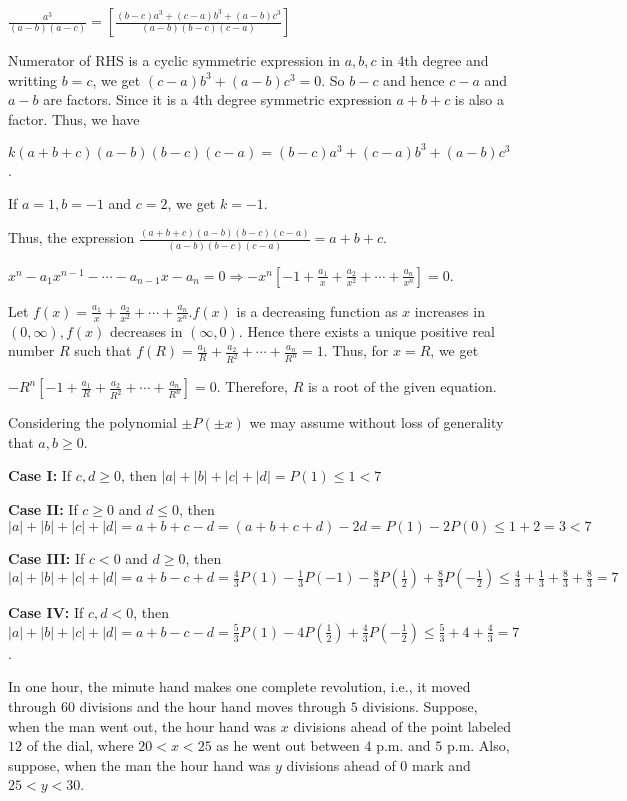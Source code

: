  $\displaystyle\frac{a^3}{(a - b)(a - c)} = \left[\frac{(b - c)a^3 + (c - a)b^3 + (a - b)c^3}{(a - b)(b -
      c)(c - a)}\right]$

  Numerator of RHS is a cyclic symmetric expression in $a, b, c$ in $4$th degree and writting $b = c$, we
  get $(c - a)b^3 + (a - b)c^3 = 0$. So $b - c$ and hence $c - a$ and $a - b$ are factors. Since it is a
  $4$th degree symmetric expression $a + b + c$ is also a factor. Thus, we have

  $k(a + b + c)(a - b)(b - c)(c - a) = (b - c)a^3 + (c - a)b^3 + (a - b)c^3$.

  If $a = 1, b = -1$ and $c = 2$, we get $k = -1$.

  Thus, the expression $\frac{(a + b + c)(a - b)(b - c)(c - a)}{(a - b)(b - c)(c - a)} = a + b + c$.
\item $x^n - a_1x^{n-1} - \cdots - a_{n - 1}x - a_n = 0\Rightarrow -x^n\left[-1 + \frac{a_1}{x} +
  \frac{a_2}{x^2} + \cdots + \frac{a_n}{x^n}\right] = 0$.

  Let $f(x) = \frac{a_1}{x} + \frac{a_2}{x^2} + \cdots + \frac{a_n}{x^n}. f(x)$ is a decreasing function as
  $x$ increases in $(0, \infty), f(x)$ decreases in $(\infty, 0)$. Hence there exists a unique positive real
  number $R$ such that $f(R) = \frac{a_1}{R} + \frac{a_2}{R^2} + \cdots + \frac{a_n}{R^n} = 1$. Thus, for $x
  = R$, we get

  $-R^n\left[-1 + \frac{a_1}{R} + \frac{a_2}{R^2} + \cdots + \frac{a_n}{R^n}\right] = 0$. Therefore, $R$ is
  a root of the given equation.
\item Considering the polynomial $\pm P(\pm x)$ we may assume without loss of generality that $a, b\geq 0$.

  {\bf Case I:} If $c, d\geq 0$, then $|a| + |b| + |c| + |d| = P(1)\leq 1 < 7$

  {\bf Case II:} If $c\geq 0$ and $d\leq 0$, then $|a| + |b| + |c| + |d| = a + b + c - d = (a + b + c + d) -
  2d = P(1) - 2P(0) \leq 1 + 2 = 3 < 7$

  {\bf Case III:} If $c < 0$ and $d \geq 0$, then $|a| + |b| + |c| + |d| = a + b - c + d = \frac{4}{3}P(1) -
  \frac{1}{3}P(-1) - \frac{8}{3}P\left(\frac{1}{2}\right) + \frac{8}{3}P\left(-\frac{1}{2}\right)\leq
  \frac{4}{3} + \frac{1}{3} + \frac{8}{3} + \frac{8}{3} = 7$

  {\bf Case IV:} If $c, d < 0$, then $|a| + |b| + |c| + |d| = a + b - c - d = \frac{5}{3}P(1) -
  4P\left(\frac{1}{2}\right) + \frac{4}{3}P\left(-\frac{1}{2}\right) \leq \frac{5}{3} + 4 + \frac{4}{3} =
  7$.
\item In one hour, the minute hand makes one complete revolution, i.e., it moved through $60$ divisions and
  the hour hand moves through $5$ divisions. Suppose, when the man went out, the hour hand was $x$ divisions
  ahead of the point labeled $12$ of the dial, where $20 < x < 25$ as he went out between $4$ p.m. and $5$
  p.m. Also, suppose, when the man the hour hand was $y$ divisions ahead of $0$ mark and $25 < y < 30$.

